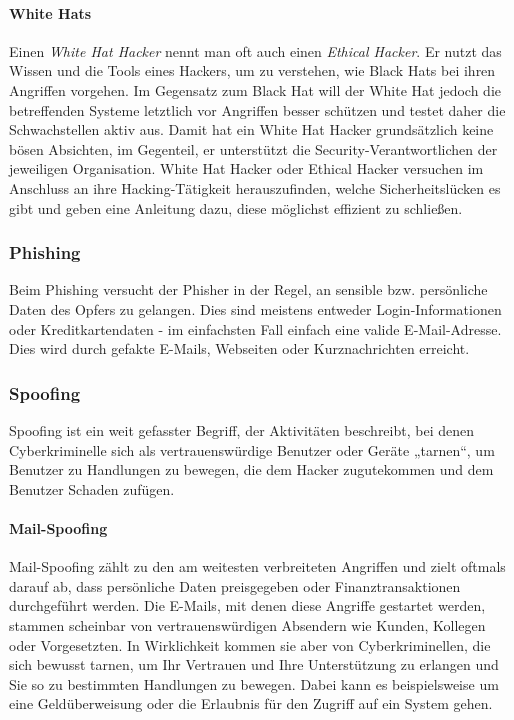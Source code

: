 \paragraph{White Hats} Einen \textit{White Hat Hacker} nennt man oft auch einen \textit{Ethical Hacker}. Er nutzt das Wissen und die Tools eines Hackers, um zu verstehen, wie Black Hats bei ihren Angriffen vorgehen. Im Gegensatz zum Black Hat will der White Hat jedoch die betreffenden Systeme letztlich vor Angriffen besser schützen und testet daher die Schwachstellen aktiv aus. Damit hat ein White Hat Hacker grundsätzlich keine bösen Absichten, im Gegenteil, er unterstützt die Security-Verantwortlichen der jeweiligen Organisation. White Hat Hacker oder Ethical Hacker versuchen im Anschluss an ihre Hacking-Tätigkeit herauszufinden, welche Sicherheitslücken es gibt und geben eine Anleitung dazu, diese möglichst effizient zu schließen.

\subsubsection{Phishing}
\label{sec:Phishing}

Beim Phishing versucht der Phisher in der Regel, an sensible bzw. persönliche Daten des Opfers zu gelangen. Dies sind meistens entweder Login-Informationen oder Kreditkartendaten - im einfachsten Fall einfach eine valide E-Mail-Adresse. Dies wird durch gefakte E-Mails, Webseiten oder Kurznachrichten erreicht.

\subsubsection{Spoofing}
\label{sec:Spoofing}


Spoofing ist ein weit gefasster Begriff, der Aktivitäten beschreibt, bei denen Cyberkriminelle sich als vertrauenswürdige Benutzer oder Geräte „tarnen“, um Benutzer zu Handlungen zu bewegen, die dem Hacker zugutekommen und dem Benutzer Schaden zufügen.

\paragraph{Mail-Spoofing} Mail-Spoofing zählt zu den am weitesten verbreiteten Angriffen und zielt oftmals darauf ab, dass persönliche Daten preisgegeben oder Finanztransaktionen durchgeführt werden. Die E-Mails, mit denen diese Angriffe gestartet werden, stammen scheinbar von vertrauenswürdigen Absendern wie Kunden, Kollegen oder Vorgesetzten. In Wirklichkeit kommen sie aber von Cyberkriminellen, die sich bewusst tarnen, um Ihr Vertrauen und Ihre Unterstützung zu erlangen und Sie so zu bestimmten Handlungen zu bewegen. Dabei kann es beispielsweise um eine Geldüberweisung oder die Erlaubnis für den Zugriff auf ein System gehen.

